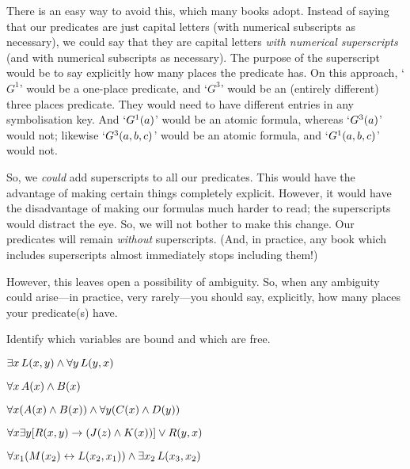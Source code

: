 There is an easy way to avoid this, which many books adopt. Instead of saying that our predicates are just capital letters (with numerical subscripts as necessary), we could say that they are capital letters \emph{with numerical superscripts} (and with numerical subscripts as necessary). The purpose of the superscript would be to say explicitly how many places the predicate has. On this approach, `$G^1$' would be a one-place predicate, and `$G^3$' would be an (entirely different) three places predicate. They would need to have different entries in any symbolisation key. And `$G^1(a)$' would be an atomic formula, whereas `$G^3(a)$' would not; likewise `$G^3(a,b,c)$' would be an atomic formula, and `$G^1(a,b,c)$' would not.

So, we \emph{could} add superscripts to all our predicates. This would have the advantage of making certain things completely explicit. However, it would have the disadvantage of making our formulas much harder to read; the superscripts would distract the eye. So, we will not bother to make this change. Our predicates will remain \emph{without} superscripts.  (And, in practice, any book which includes superscripts almost immediately stops including them!)

However, this leaves open a possibility of ambiguity. So, when any ambiguity could arise---in practice, very rarely---you should say, explicitly, how many places your predicate(s) have.

\practiceproblems
\problempart
\label{pr.freeFOL}
Identify which variables are bound and which are free.
\begin{compactlist}
\item $\exists x\, L(x,y) \wedge \forall y\, L(y,x)$
\item $\forall x\, A(x) \wedge B(x)$
\item $\forall x (A(x) \wedge B(x)) \wedge \forall y(C(x) \wedge D(y))$
\item $\forall x\exists y[R(x,y) \rightarrow (J(z) \wedge K(x))] \vee R(y,x)$
\item $\forall x_1(M(x_2) \leftrightarrow L(x_2,x_1)) \wedge \exists x_2\,L(x_3,x_2)$
\end{compactlist}


